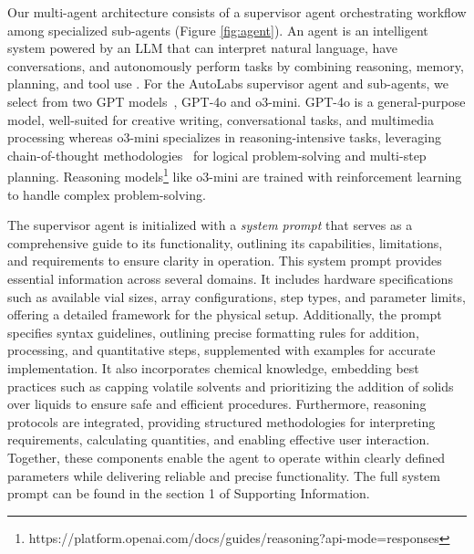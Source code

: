 \documentclass[sn-nature, twocolumn]{sn-jnl}%
\theoremstyle{thmstyleone}%
\theoremstyle{thmstyletwo}%
\theoremstyle{thmstylethree}%
\begin{document}
Our multi-agent architecture consists of a supervisor agent orchestrating workflow among specialized sub-agents (Figure \ref{fig:agent}). An agent is an intelligent system powered by an LLM that can interpret natural language, have conversations, and autonomously perform tasks by combining reasoning, memory, planning, and tool use \cite{gridach2025agenticaiscientificdiscovery,
ghafarollahi2024sciagentsautomatingscientificdiscovery,sapkota2025aiagentsvsagentic, packer2024memgptllmsoperatingsystems, yuan2024easytoolenhancingllmbasedagents, yu2025chemtoolagentimpacttoolslanguage, yang2023gpt4toolsteachinglargelanguage, wu2025chematagentenhancingllmschemistry, zhu2025knowagentknowledgeaugmentedplanningllmbased, zhu2025healthflowselfevolvingaiagent, zhou2025greaterautonomymaterialsdiscovery, rivera2024conceptagentllmdrivenpreconditiongrounding, zhou2025scientistsexamprobingcognitive, yao2023reactsynergizingreasoningacting, xu2025advancingaiscientistunderstandingmultiagent, wei2025alignragleveragingcritiquelearning, wei2023chainofthoughtpromptingelicitsreasoning, lu2024aiscientistfullyautomated}. For the AutoLabs supervisor agent and sub-agents, we select from two GPT models~\cite{openai2024gpt4technicalreport}, GPT-4o and o3-mini. GPT-4o is a general-purpose model, well-suited for creative writing, conversational tasks, and multimedia processing whereas o3-mini specializes in reasoning-intensive tasks, leveraging chain-of-thought methodologies~\cite{NEURIPS2023_dfc310e8} for logical problem-solving and multi-step planning. 
Reasoning models\footnote{https://platform.openai.com/docs/guides/reasoning?api-mode=responses} like o3-mini are trained with reinforcement learning to handle complex problem-solving. 

The supervisor agent is initialized with a \textit{system prompt} that serves as a comprehensive guide to its functionality, outlining its capabilities, limitations, and requirements to ensure clarity in operation\cite{schulhoff2025promptreportsystematicsurvey, suzgun2024metapromptingenhancinglanguagemodels, Zhang_2025, jiang2023llmlinguacompressingpromptsaccelerated}. This system prompt provides essential information across several domains. It includes hardware specifications such as available vial sizes, array configurations, step types, and parameter limits, offering a detailed framework for the physical setup. Additionally, the prompt specifies syntax guidelines, outlining precise formatting rules for addition, processing, and quantitative steps, supplemented with examples for accurate implementation. It also incorporates chemical knowledge, embedding best practices such as capping volatile solvents and prioritizing the addition of solids over liquids to ensure safe and efficient procedures. Furthermore, reasoning protocols are integrated, providing structured methodologies for interpreting requirements, calculating quantities, and enabling effective user interaction. Together, these components enable the agent to operate within clearly defined parameters while delivering reliable and precise functionality. The full system prompt can be found in the section 1 of Supporting Information.
\end{document}
